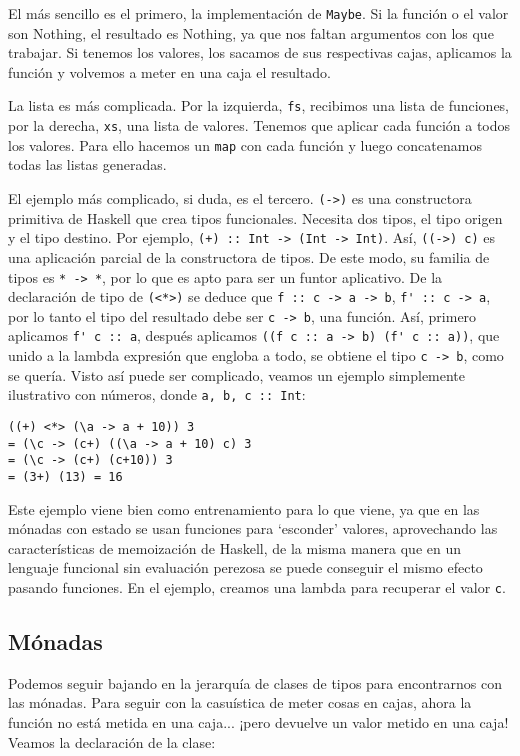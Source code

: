 \documentclass[class=article, crop=false]{standalone}
\begin{document}
El más sencillo es el primero, la implementación de \verb`Maybe`. Si la función o el valor
son Nothing, el resultado es Nothing, ya que nos faltan argumentos con los que trabajar. Si
tenemos los valores, los sacamos de sus respectivas cajas, aplicamos la función y volvemos a
meter en una caja el resultado.

La lista es más complicada. Por la izquierda, \verb`fs`, recibimos una lista de funciones,
por la derecha, \verb`xs`, una lista de valores. Tenemos que aplicar cada función a todos los
valores. Para ello hacemos un \verb`map` con cada función y luego concatenamos todas las
listas generadas.

El ejemplo más complicado, si duda, es el tercero. \verb`(->)` es una constructora primitiva
de Haskell que crea tipos funcionales. Necesita dos tipos, el tipo origen y el tipo destino.
Por ejemplo, \verb`(+) :: Int -> (Int -> Int)`. Así, \verb`((->) c)` es una aplicación
parcial de la constructora de tipos. De este modo, su familia de tipos es \verb`* -> *`, por
lo que es apto para ser un funtor aplicativo. De la declaración de tipo de \verb`(<*>)` se
deduce que \verb`f :: c -> a -> b`, \verb`f' :: c -> a`, por lo tanto el tipo del resultado
debe ser \verb`c -> b`, una función. Así, primero aplicamos \verb`f' c :: a`, después
aplicamos \verb`((f c :: a -> b) (f' c :: a))`, que unido a la lambda expresión que engloba a
todo, se obtiene el tipo \verb`c -> b`, como se quería. Visto así puede ser complicado,
veamos un ejemplo simplemente ilustrativo con números, donde \verb`a, b, c :: Int`:

\verb`((+) <*> (\a -> a + 10)) 3` \\
\verb`= (\c -> (c+) ((\a -> a + 10) c) 3` \\
\verb`= (\c -> (c+) (c+10)) 3` \\
\verb`= (3+) (13) = 16`

Este ejemplo viene bien como entrenamiento para lo que viene, ya que en las mónadas con
estado se usan funciones para `esconder' valores, aprovechando las características de
memoización de Haskell, de la misma manera que en un lenguaje funcional sin evaluación
perezosa se puede conseguir el mismo efecto pasando funciones. En el ejemplo, creamos una
lambda para recuperar el valor \verb`c`.

\subsection{Mónadas}
Podemos seguir bajando en la jerarquía de clases de tipos para encontrarnos con las mónadas.
Para seguir con la casuística de meter cosas en cajas, ahora la función no está metida en una
caja... ¡pero devuelve un valor metido en una caja! Veamos la declaración de la clase:
\end{document}
